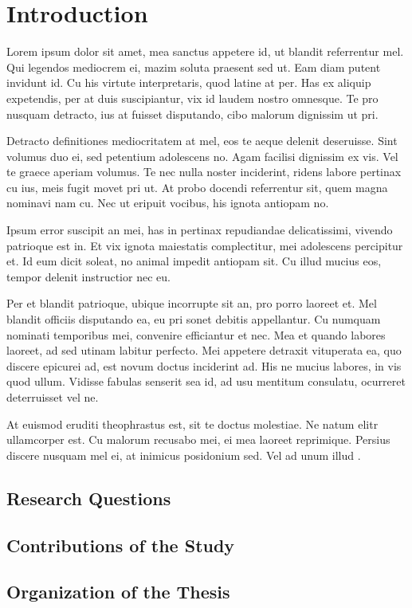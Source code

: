 \chapter{Introduction}
\label{chp:b1}


Lorem ipsum dolor sit amet, mea sanctus appetere id, ut blandit referrentur mel. Qui legendos mediocrem ei, mazim soluta praesent sed ut. Eam diam putent invidunt id. Cu his virtute interpretaris, quod latine at per. Has ex aliquip expetendis, per at duis suscipiantur, vix id laudem nostro omnesque. Te pro nusquam detracto, ius at fuisset disputando, cibo malorum dignissim ut pri.

Detracto definitiones mediocritatem at mel, eos te aeque delenit deseruisse. Sint volumus duo ei, sed petentium adolescens no. Agam facilisi dignissim ex vis. Vel te graece aperiam volumus. Te nec nulla noster inciderint, ridens labore pertinax cu ius, meis fugit movet pri ut. At probo docendi referrentur sit, quem magna nominavi nam cu. Nec ut eripuit vocibus, his ignota antiopam no.

Ipsum error suscipit an mei, has in pertinax repudiandae delicatissimi, vivendo patrioque est in. Et vix ignota maiestatis complectitur, mei adolescens percipitur et. Id eum dicit soleat, no animal impedit antiopam sit. Cu illud mucius eos, tempor delenit instructior nec eu.

Per et blandit patrioque, ubique incorrupte sit an, pro porro laoreet et. Mel blandit officiis disputando ea, eu pri sonet debitis appellantur. Cu numquam nominati temporibus mei, convenire efficiantur et nec. Mea et quando labores laoreet, ad sed utinam labitur perfecto. Mei appetere detraxit vituperata ea, quo discere epicurei ad, est novum doctus inciderint ad. His ne mucius labores, in vis quod ullum. Vidisse fabulas senserit sea id, ad usu mentitum consulatu, ocurreret deterruisset vel ne.

At euismod eruditi theophrastus est, sit te doctus molestiae. Ne natum elitr ullamcorper est. Cu malorum recusabo mei, ei mea laoreet reprimique. Persius discere nusquam mel ei, at inimicus posidonium sed. Vel ad unum illud \cite{Cohen1992}.

\section{Research Questions}


\section{Contributions of the Study}

\section{Organization of the Thesis}

